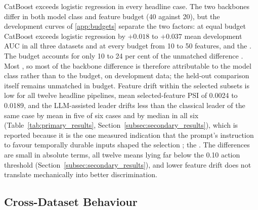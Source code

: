 \documentclass[final,5p,twocolumn]{elsarticle}
\providecommand{\DIFaddtex}[1]{{\protect\color{blue} \sf #1}} %
\providecommand{\DIFdeltex}[1]{{\protect\color{red} \scriptsize #1}} %
\providecommand{\DIFaddbegin}{} %
\providecommand{\DIFaddend}{} %
\providecommand{\DIFdelbegin}{} %
\providecommand{\DIFdelend}{} %
\providecommand{\DIFadd}[1]{\texorpdfstring{\DIFaddtex{#1}}{#1}} %
\providecommand{\DIFdel}[1]{\texorpdfstring{\DIFdeltex{#1}}{}} %
\begin{document}
\DIFaddend CatBoost exceeds logistic regression in every headline case. The two backbones differ in both model class and feature budget\DIFdelbegin \DIFdel{(40 against 20)}\DIFdelend , but the development curves of \ref{app:budgets} separate the two factors: at equal budget CatBoost exceeds logistic regression by $+0.018$ to $+0.037$ mean development AUC in all three datasets and at every budget\DIFdelbegin \DIFdel{from 10 to 50 features, and the }\DIFdelend \DIFaddbegin \DIFadd{. The }\DIFaddend budget accounts for only 10 to 24 per cent of the unmatched difference\DIFdelbegin \DIFdel{. Most }\DIFdelend \DIFaddbegin \DIFadd{, so most }\DIFaddend of the backbone difference is \DIFdelbegin \DIFdel{therefore }\DIFdelend attributable to the model class rather than to the budget, on development data; the held-out comparison itself remains unmatched in budget. Feature drift within the selected subsets is low for all twelve headline pipelines, mean selected-feature PSI of 0.0024 to 0.0189, and the LLM-assisted leader drifts less than the classical leader of the same case by mean in five of six cases and by median in all six (Table~\ref{tab:primary_results}, Section~\ref{subsec:secondary_results}), which is reported because it is the one measured indication that the prompt's instruction to favour temporally durable inputs shaped the selection\DIFdelbegin \DIFdel{; the }\DIFdelend \DIFaddbegin \DIFadd{. The }\DIFaddend differences are small in absolute terms, all twelve means lying far below the 0.10 action threshold (Section~\ref{subsec:secondary_results}), and lower feature drift does not translate mechanically into better discrimination.

\subsection{Cross-Dataset Behaviour}
\label{subsec:cross_dataset}
\end{document}
